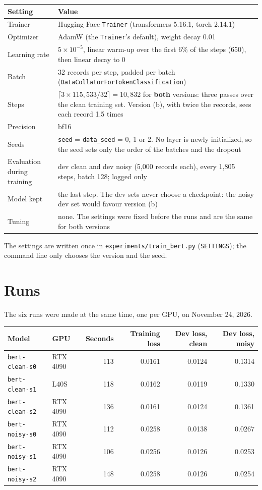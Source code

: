 \documentclass[10pt,a4paper]{article}
\newcommand{\file}[1]{\texttt{#1}}
\begin{document}
\begin{tabularx}{\linewidth}{@{}lL@{}}
\toprule
Setting & Value \\
\midrule
Trainer & Hugging Face \file{Trainer} (transformers 5.16.1, torch 2.14.1) \\
Optimizer & AdamW (the \file{Trainer}'s default), weight decay 0.01 \\
Learning rate & $5\times10^{-5}$, linear warm-up over the first 6\% of the steps (650), then linear decay to 0 \\
Batch & 32 records per step, padded per batch (\file{DataCollatorForTokenClassification}) \\
Steps & $\lceil 3 \times 115{,}533 / 32 \rceil = 10{,}832$ for \textbf{both} versions: three passes over the clean training set. Version (b), with twice the records, sees each record 1.5 times \\
Precision & bf16 \\
Seeds & \file{seed} = \file{data\_seed} = 0, 1 or 2. No layer is newly initialized, so the seed sets only the order of the batches and the dropout \\
Evaluation during training & dev clean and dev noisy (5,000 records each), every 1,805 steps, batch 128; logged only \\
Model kept & the last step. The dev sets never choose a checkpoint: the noisy dev set would favour version (b) \\
Tuning & none. The settings were fixed before the runs and are the same for both versions \\
\bottomrule
\end{tabularx}

The settings are written once in \file{experiments/train\_bert.py} (\file{SETTINGS}); the command
line only chooses the version and the seed.

\section{Runs}

The six runs were made at the same time, one per GPU, on November 24, 2026.

\begin{center}
\begin{tabular}{@{}llrrrr@{}}
\toprule
Model & GPU & Seconds & Training loss & Dev loss, clean & Dev loss, noisy \\
\midrule
\file{bert-clean-s0} & RTX 4090 & 113 & 0.0161 & 0.0124 & 0.1314 \\
\file{bert-clean-s1} & L40S & 118 & 0.0162 & 0.0119 & 0.1330 \\
\file{bert-clean-s2} & RTX 4090 & 136 & 0.0161 & 0.0124 & 0.1361 \\
\midrule
\file{bert-noisy-s0} & RTX 4090 & 112 & 0.0258 & 0.0138 & 0.0267 \\
\file{bert-noisy-s1} & RTX 4090 & 106 & 0.0256 & 0.0126 & 0.0253 \\
\file{bert-noisy-s2} & RTX 4090 & 148 & 0.0258 & 0.0126 & 0.0254 \\
\bottomrule
\end{tabular}
\end{center}
\end{document}
